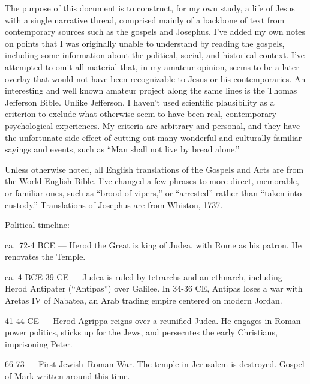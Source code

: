 \documentclass[8pt]{article}
\begin{document}
The purpose of this document is to construct, for my own study, a life of Jesus with a single narrative
thread, comprised mainly of a backbone of text from contemporary sources such as the gospels and Josephus.
I've added my own notes on points that I was originally unable to understand by reading the gospels,
including some information about the political, social, and historical context. I've attempted to
omit all material that, in my amateur opinion, seems to be a later overlay that would not have
been recognizable to Jesus or his contemporaries. An interesting and well known amateur project along
the same lines is the Thomas Jefferson Bible. Unlike Jefferson, I haven't used scientific plausibility
as a criterion to exclude what otherwise seem to have been real, contemporary psychological experiences.
My criteria are arbitrary and personal, and they have the unfortunate side-effect of cutting out many
wonderful and culturally familiar sayings and events, such as ``Man shall not live by bread alone.''

Unless otherwise noted, all English translations of the Gospels and Acts are from the World English Bible.
I've changed a few phrases to more direct, memorable, or familiar ones, such as ``brood of vipers,''
or ``arrested'' rather than ``taken into custody.''
Translations of Josephus are from Whiston, 1737.

Political timeline:

ca.~72-4 BCE --- Herod the Great is king of Judea, with Rome as his patron. He renovates the Temple.

ca. 4 BCE-39 CE --- Judea is ruled by tetrarchs and an ethnarch, including Herod Antipater (``Antipas'') over Galilee.
      In 34-36 CE, Antipas loses a war with Aretas IV of Nabatea, an Arab trading empire centered on modern Jordan.

41-44 CE --- Herod Agrippa reigns over a reunified Judea. He engages in Roman power politics, sticks up for the Jews,
      and persecutes the early Christians, imprisoning Peter.

66-73 --- First Jewish–Roman War. The temple in Jerusalem is destroyed. Gospel of Mark written around this time.
\end{document}
